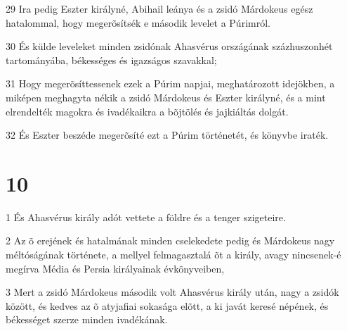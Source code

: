 \par 29 Ira pedig Eszter királyné, Abihail leánya és a zsidó Márdokeus egész hatalommal, hogy megerõsítsék e második levelet a Púrimról.
\par 30 És külde leveleket minden zsidónak Ahasvérus országának százhuszonhét tartományába, békességes és igazságos szavakkal;
\par 31 Hogy megerõsíttessenek ezek a Púrim napjai, meghatározott idejökben, a miképen meghagyta nékik a zsidó Márdokeus és Eszter királyné, és a mint elrendelték  magokra és ivadékaikra a bõjtölés és jajkiáltás dolgát.
\par 32 És Eszter beszéde megerõsíté ezt a Púrim történetét, és könyvbe iraték.

\chapter{10}

\par 1 És Ahasvérus király adót vettete a földre és a tenger szigeteire.
\par 2 Az õ erejének és hatalmának minden cselekedete pedig és Márdokeus nagy méltóságának története, a mellyel felmagasztalá õt a király, avagy nincsenek-é megírva Média és Persia királyainak évkönyveiben,
\par 3 Mert a zsidó Márdokeus második volt Ahasvérus király után, nagy a zsidók között, és kedves az õ atyjafiai sokasága elõtt, a ki javát keresé népének, és békességet szerze minden ivadékának.


